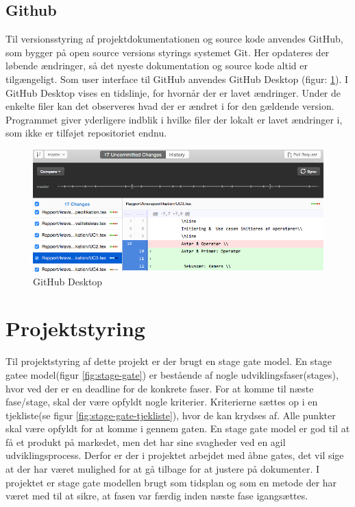 \subsection{Github}
\label{subsec:github}
Til versionsstyring af projektdokumentationen og source kode anvendes GitHub, som bygger på open source versions styrings systemet Git. Her opdateres der løbende ændringer, så det nyeste dokumentation og source kode altid er tilgængeligt. 
Som user interface til GitHub anvendes GitHub Desktop (figur: \ref{fig:git}). I GitHub Desktop vises en tidslinje, for hvornår der er lavet ændringer. Under de enkelte filer kan det observeres hvad der er ændret i for den gældende version. Programmet giver yderligere indblik i hvilke filer der lokalt er lavet ændringer i, som ikke er tilføjet repositoriet endnu.
\begin{figure}[H]
	\centering
	\includegraphics[width=1\textwidth]{billeder/github.png}
	\caption{GitHub Desktop}
	\label{fig:git}
\end{figure}
\newpage

\section{Projektstyring} 
Til projektstyring af dette projekt er der brugt en stage gate model. En stage gatee model(figur \ref{fig:stage-gate}) er bestående af nogle udviklingsfaser(stages), hvor ved der er en deadline for de konkrete faser. For at komme til næste fase/stage, skal der være opfyldt nogle kriterier. Kriterierne sættes op i en tjekliste(se figur \ref{fig:stage-gate-tjekliste}), hvor de kan krydses af. Alle punkter skal være opfyldt for at komme i gennem gaten. En stage gate model er god til at få et produkt på markedet, men det har sine svagheder ved en agil udviklingsprocess. Derfor er der i projektet arbejdet med åbne gates, det vil sige at der har været mulighed for at gå tilbage for at justere på dokumenter. I projektet er stage gate modellen brugt som tidsplan og som en metode der har været med til at sikre, at fasen var færdig inden næste fase igangsættes. 

